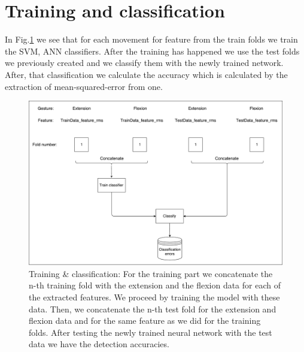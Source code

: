 \section{Training and classification}
In Fig.\ref{fig:train_classification} we see that for each movement for feature from the train folds we train the SVM, \ac{ANN} classifiers. After the training has happened we use the test folds we previously created and we classify them with the newly trained network. After, that classification we calculate the accuracy which is calculated by the extraction of mean-squared-error from one.
\begin{figure}[h!]
\includegraphics[width=15cm,center,keepaspectratio]{figures/train_classification}
\caption{Training \& classification: For the training part we concatenate the n-th training fold with the extension and the flexion data for each of the extracted features. We proceed by training the model with these data. Then, we concatenate the n-th test fold for the extension and flexion data and for the same feature as we did for the training folds. After testing the newly trained neural network with the test data we have the detection accuracies. }
\label{fig:train_classification}
\end{figure}
